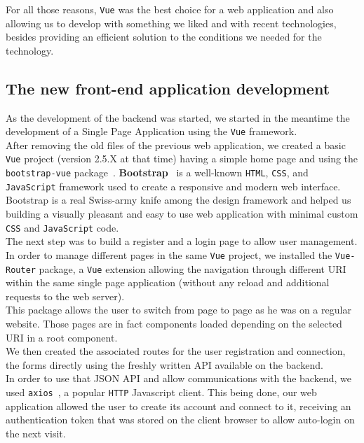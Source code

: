 \documentclass{eplmastersthesis}
\begin{document}
        For all those reasons, \texttt{Vue} was the best choice for a
        web application and also allowing us to develop with something
        we liked and with recent technologies, besides providing an efficient
        solution to the conditions we needed for the technology.

      \subsection{The new front-end application development}

        As the development of the backend was started, we started in the
        meantime the development of a Single Page Application using
        the \texttt{Vue} framework.\\

        After removing the old files of the previous web application, we
        created a basic \texttt{Vue} project (version 2.5.X at that time) having a
        simple home page and using the \texttt{bootstrap-vue} package~\cite{BootstrapVue}.
        \textbf{Bootstrap}~\cite{Bootstrap} is a
        well-known \texttt{HTML}, \texttt{CSS}, and \texttt{JavaScript} framework used to create a responsive
        and modern web interface.\\
        Bootstrap is a real Swiss-army knife among the design framework
        and helped us building a visually pleasant and easy to use
        web application with minimal custom \texttt{CSS} and \texttt{JavaScript} code.\\

        The next step was to build a register and a login page to allow
        user management. In order to manage different pages in the same \texttt{Vue}
        project, we installed the \texttt{Vue-Router} package, a \texttt{Vue} extension
        allowing the navigation through different URI within the same
        single page application (without any reload and additional requests
        to the web server).\\
        This package allows the user to switch from page to page
        as he was on a regular website. Those pages are in fact components
        loaded depending on the selected URI in a root component.\\
        We then created the associated routes for the user registration and
        connection, the forms directly using the freshly written API available
        on the backend.\\
        In order to use that JSON API and allow communications with the
        backend, we used \texttt{axios}~\cite{axios}, a popular \texttt{HTTP} Javascript client.
        This being done, our web application allowed the user to create its
        account and connect to it, receiving an authentication token that
        was stored on the client browser to allow auto-login on the next
        visit.\\
\end{document}
